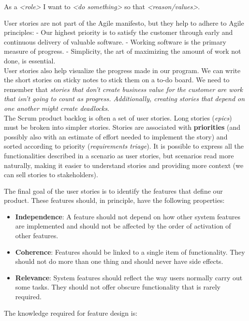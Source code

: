 As a \textit{<role>} I want to \textit{<do something>} so that \textit{<reason/values>}.

\newpage

User stories are not part of the Agile manifesto, but they help to adhere to Agile principles: 
\newline \noindent - Our highest priority is to satisfy the customer through early and continuous delivery of valuable software.
\newline \noindent - Working software is the primary measure of progress.
\newline \noindent - Simplicity, the art of maximizing the amount of work not done, is essential. \\

User stories also help visualize the progress made in our program. We can write the short stories on sticky notes to stick them on a to-do board. We need to remember that \emph{stories that don't create business value for the customer are work that isn't going to count as progress. Additionally, creating stories that depend on one another might create deadlocks}. \\

The Scrum product backlog is often a set of user stories. Long stories (\emph{epics}) must be broken into simpler stories. Stories are associated with \textbf{priorities} (and possibly also with an estimate of effort needed to implement the story) and sorted according to priority (\emph{requirements triage}). It is possible to express all the functionalities described in a scenario as user stories, but scenarios read more naturally, making it easier to understand stories and providing more context (we can sell stories to stakeholders).

The final goal of the user stories is to identify the features that define our product. These features should, in principle, have the following properties:

\begin{itemize}
    \item \textbf{Independence}: A feature should not depend on how other system features are implemented and should not be affected by the order of activation of other features.
    \item \textbf{Coherence}: Features should be linked to a single item of functionality. They should not do more than one thing and should never have side effects.
    \item \textbf{Relevance}: System features should reflect the way users normally carry out some tasks. They should not offer obscure functionality that is rarely required.
\end{itemize}
\newpage
The knowledge required for feature design is:

